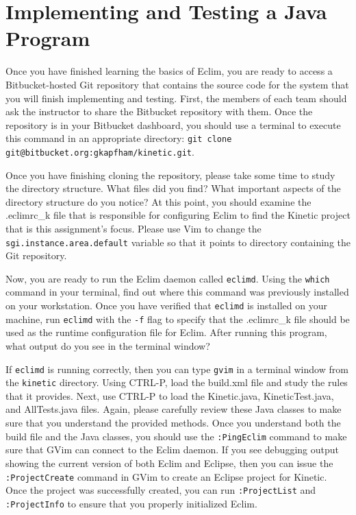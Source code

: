 \section*{Implementing and Testing a Java Program}

Once you have finished learning the basics of Eclim, you are ready to access a Bitbucket-hosted Git repository that
contains the source code for the system that you will finish implementing and testing.  First, the members of each team
should ask the instructor to share the Bitbucket repository with them. Once the repository is in your Bitbucket
dashboard, you should use a terminal to execute this command in an appropriate directory: {\tt git clone
git@bitbucket.org:gkapfham/kinetic.git}.

Once you have finishing cloning the repository, please take some time to study the directory structure.  What files did
you find? What important aspects of the directory structure do you notice?  At this point, you should examine the
.eclimrc\_k file that is responsible for configuring Eclim to find the Kinetic project that is this assignment's focus.
Please use Vim to change the {\tt sgi.instance.area.default} variable so that it points to directory containing the Git
repository. 

Now, you are ready to run the Eclim daemon called {\tt eclimd}.  Using the {\tt which} command in your terminal, find
out where this command was previously installed on your workstation.  Once you have verified that {\tt eclimd} is
installed on your machine, run {\tt eclimd} with the {\tt -f} flag to specify that the .eclimrc\_k file should be used
as the runtime configuration file for Eclim.  After running this program, what output do you see in the terminal window?

If {\tt eclimd} is running correctly, then you can type {\tt gvim} in a terminal window from the {\tt kinetic}
directory. Using CTRL-P, load the build.xml file and study the rules that it provides.  Next, use CTRL-P to load the
Kinetic.java, KineticTest.java, and AllTests.java files.  Again, please carefully review these Java classes to make sure
that you understand the provided methods. Once you understand both the build file and the Java classes, you should 
use the {\tt :PingEclim} command to make sure that GVim can connect to the Eclim daemon.  If you see debugging output
showing the current version of both Eclim and Eclipse, then you can issue the {\tt :ProjectCreate} command in GVim to
create an Eclipse project for Kinetic.  Once the project was successfully created, you can run {\tt :ProjectList}
and {\tt :ProjectInfo} to ensure that you properly initialized Eclim. 
 
